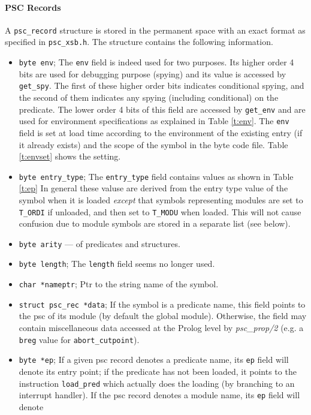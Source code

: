 \documentclass[11pt]{article}
\begin{document}
\paragraph*{PSC Records}
A {\tt psc\_record} structure is stored in the permanent space with an
exact format as specified in {\tt psc\_xsb.h}.  The structure contains
the following information.
%
\begin{itemize}
\item {\tt byte env}; The {\tt env} field is indeed used for two
purposes. Its higher order 4 bits are used for debugging purpose
(spying) and its value is accessed by {\tt get\_spy}.  The first of
these higher order bits indicates conditional spying, and the second
of them indicates any spying (including conditional) on the predicate.
The lower order 4 bits of this field are accessed by {\tt get\_env}
and are used for environment specifications as explained in Table
\ref{t:env}.  The {\tt env} field is set at load time according to the
environment of the existing entry (if it already exists) and the scope
of the symbol in the byte code file.  Table \ref{t:envset} shows the
setting.
%
\item {\tt byte entry\_type}; The {\tt entry\_type} field contains
values as shown in Table \ref{t:ep} In general these valuse are
derived from the entry type value of the symbol when it is loaded {\em
except} that symbols representing modules are set to {\tt T\_ORDI} if
unloaded, and then set to {\tt T\_MODU} when loaded.  This will not
cause confusion due to module symbols are stored in a separate list
(see below).
%
\item {\tt byte arity} --- of predicates and structures.
%
\item {\tt byte length}; The {\tt length} field seems no longer used.
%
\item   {\tt char *nameptr}; Ptr to the string name of the symbol.
%
\item {\tt struct psc\_rec *data}; If the symbol is a predicate name,
this field points to the psc of its module (by default the global
module).  Otherwise, the field may contain miscellaneous data accessed
at the Prolog level by {\em psc\_prop/2} (e.g. a {\tt breg} value for
{\tt abort\_cutpoint}).
%
\item {\tt byte *ep}; If a given psc record denotes a predicate name,
its {\tt ep} field will denote its entry point; if the predicate has
not been loaded, it points to the instruction {\tt load\_pred} which
actually does the loading (by branching to an interrupt handler).  If
the psc record denotes a module name, its {\tt ep} field will denote

\end{itemize}
\end{document}
